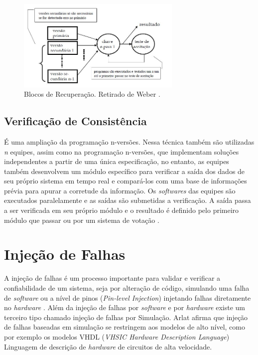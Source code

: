 \begin{figure}[H]
	\centering
	\includegraphics[width=0.7\textwidth]{figuras/blocoRecuperacao.jpg}
	\caption[Blocos de Recuperação]{Blocos de Recuperação. Retirado de Weber \cite{Weber:2002}.}
	\label{Img:blocoRecuperacao}	
\end{figure}


\subsection{Verificação de Consistência}

É uma ampliação da programação n-versões. Nessa técnica também são utilizadas \textit{n} equipes, assim como na programação n-versões, que implementam soluções independentes a partir de uma única especificação, no entanto, as equipes também desenvolvem um módulo específico para verificar a saída dos dados de seu próprio sistema em tempo real e compará-los com uma base de informações prévia para apurar a corretude da informação. Os \textit{softwares} das equipes são executados paralelamente e as saídas são submetidas a verificação. A saída passa a ser verificada em seu próprio módulo e o resultado é definido pelo primeiro módulo que passar ou por um sistema de votação \cite{Nelson:1990,Kruger:2014}.

\section{Injeção de Falhas} \label{sec:InjecaoDeFalhas}

A injeção de falhas é um processo importante para validar e verificar a confiabilidade de um sistema, seja por alteração de código, simulando uma falha de \textit{software} \cite{Kanawati:1995} ou a nível de pinos (\textit{Pin-level Injection}) injetando falhas diretamente no \textit{hardware} \cite{Arlat:2003}. Além da injeção de  falhas por \textit{software} e por \textit{hardware} existe um terceiro tipo chamado injeção de falhas por Simulação. Arlat \cite{Arlat:2003} afirma que injeção de falhas baseadas em simulação se restringem aos modelos de alto nível, como por exemplo os modelos VHDL (\textit{VHSIC Hardware Description Language}) Linguagem de descrição de \textit{hardware} de circuitos de alta velocidade. 

